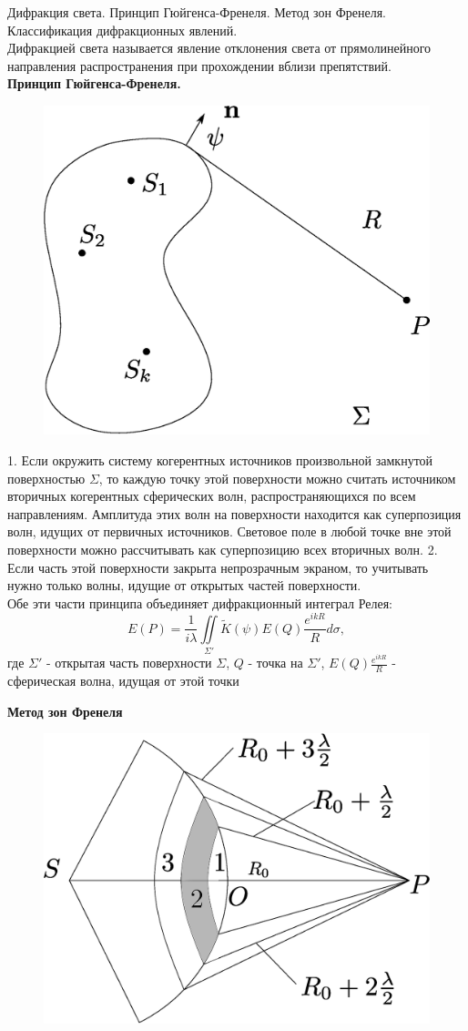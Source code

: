 \documentclass[__main__.tex]{subfiles}
\begin{document}
	
Дифракция света. Принцип Гюйгенса-Френеля. Метод зон Френеля. Классификация дифракционных явлений.\\
Дифракцией света называется явление отклонения света от прямолинейного направления распространения при прохождении вблизи препятствий.\\
\textbf{Принцип Гюйгенса-Френеля. }\\

\begin{figure}[h]
	\begin{center}
		\includegraphics[width=0.5\linewidth]{img/o-08_1.eps}
	\end{center}
\end{figure}

1. Если окружить систему когерентных источников произвольной замкнутой поверхностью $\Sigma$, то каждую точку этой поверхности можно считать источником вторичных когерентных сферических волн, распространяющихся по всем направлениям. Амплитуда этих волн на поверхности находится как суперпозиция волн, идущих от первичных источников. Световое поле в любой точке вне этой поверхности можно рассчитывать как суперпозицию всех вторичных волн. 
2. Если часть этой поверхности закрыта непрозрачным экраном, то учитывать нужно только волны, идущие от открытых частей поверхности.\\

Обе эти части принципа объединяет дифракционный интеграл Релея:
$$E(P) = \frac{1}{i\lambda}\iint\limits_{\Sigma'} \widetilde K(\psi) E(Q)\frac{e^{ikR}}{R}d\sigma,$$
где $\Sigma'$ - открытая часть поверхности $\Sigma$, $Q$ - точка на $\Sigma'$, $E(Q)\frac{e^{ikR}}{R}$ - сферическая волна, идущая от этой точки 


\textbf{Метод зон Френеля}\\

\begin{figure}[h]
	\begin{center}
		\includegraphics[width=0.5\linewidth]{img/o-08_2.eps}
	\end{center}
\end{figure}
\end{document}
